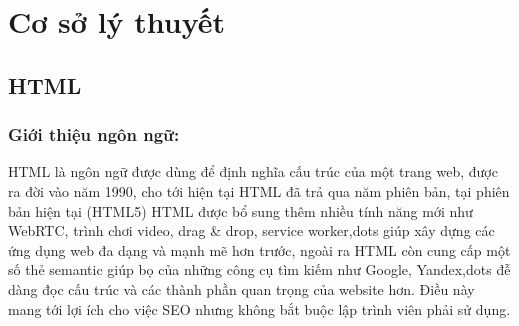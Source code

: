 \chapter{Cơ sở lý thuyết}
\section{HTML}
\subsection{Giới thiệu ngôn ngữ:}
HTML là ngôn ngữ được dùng để định nghĩa cấu trúc của một trang web, được ra đời vào năm 1990, cho tới hiện tại HTML đã trả qua năm phiên bản, tại phiên bản hiện tại (HTML5) HTML được bổ sung thêm nhiều tính năng mới như WebRTC, trình chơi video, drag \& drop, service worker,dots giúp xây dựng các ứng dụng web đa dạng và mạnh mẽ hơn trước, ngoài ra HTML còn cung cấp một số thẻ semantic giúp bọ của những công cụ tìm kiếm như Google, Yandex,dots đễ dàng đọc cấu trúc và các thành phần quan trọng của website hơn. Điều này mang tới lợi ích cho việc SEO nhưng không bắt buộc lập trình viên phải sử dụng.\par
